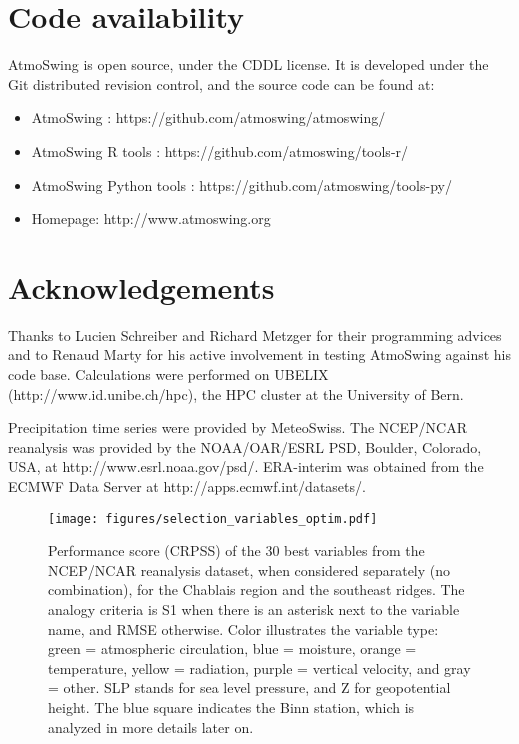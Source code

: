 \documentclass[review]{elsarticle}
\begin{document}
\section*{Code availability}

AtmoSwing is open source, under the CDDL license. It is developed under the Git distributed revision control, and the source code can be found at:

\begin{itemize}
	\item AtmoSwing \citep{Horton2018c}: https://github.com/atmoswing/atmoswing/
	\item AtmoSwing R tools \citep{Horton2018d}: https://github.com/atmoswing/tools-r/
	\item AtmoSwing Python tools \citep{Horton2018e}: https://github.com/atmoswing/tools-py/
	\item Homepage: http://www.atmoswing.org
\end{itemize}


\section*{Acknowledgements}
Thanks to Lucien Schreiber and Richard Metzger for their programming advices and to Renaud Marty for his active involvement in testing AtmoSwing against his code base. Calculations were performed on UBELIX (http://www.id.unibe.ch/hpc), the HPC cluster at the University of Bern. 

Precipitation time series were provided by MeteoSwiss. The NCEP/NCAR reanalysis was provided by the NOAA/OAR/ESRL PSD, Boulder, Colorado, USA, at http://www.esrl.noaa.gov/psd/. ERA-interim was obtained from the ECMWF Data Server at http://apps.ecmwf.int/datasets/. 





\clearpage


\begin{figure*}[t]
	\texttt{[image: figures/selection\_variables\_optim.pdf]}
	\caption{Performance score (CRPSS) of the 30 best variables from the NCEP/NCAR reanalysis dataset, when considered separately (no combination), for the Chablais region and the southeast ridges. The analogy criteria is S1 when there is an asterisk next to the variable name, and RMSE otherwise. Color illustrates the variable type: green = atmospheric circulation, blue = moisture, orange = temperature, yellow = radiation, purple = vertical velocity, and gray = other. SLP stands for sea level pressure, and Z for geopotential height. The blue square indicates the Binn station, which is analyzed in more details later on.}
	\label{figure:variable_exploration}
\end{figure*}
\end{document}
